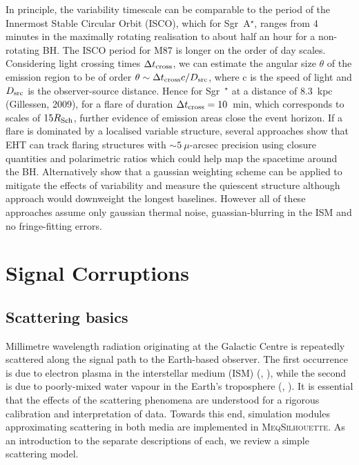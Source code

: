 In principle, the variability timescale can be comparable to the period of the Innermost Stable Circular Orbit (ISCO), which for Sgr~A$^\star$, ranges from 4 minutes in the maximally rotating realisation to about half an hour for a non-rotating BH. The ISCO period for M87 is longer on the order of day scales. Considering light crossing times $\Delta t_{\rm cross}$, we can estimate the angular size $\theta$ of the emission region to be of order $\theta \sim \Delta t_{\rm cross} c /D_{\rm src}$, where c is the speed of light and $D_{\rm src}$ is the observer-source distance. Hence for Sgr~$^\star$ at a distance of $8.3$~kpc (Gillessen, 2009), for a flare of duration $ \Delta t_{\rm cross} =10$~min, which corresponds to scales of  $15 R_{\rm Sch}$, further evidence of emission areas close the event horizon.
If a flare is dominated by a localised variable structure, several approaches \citep{Doeleman_2009, Fish_2009b, Johnson_2014} show that EHT can track flaring structures with $\sim 5\ \mu$-arcsec precision using closure quantities and polarimetric ratios which could help map the spacetime around the BH. Alternatively \citet{Lu_2016} show that a gaussian weighting scheme can be applied to mitigate the effects of variability and measure the quiescent structure although approach would downweight the longest baselines. However all of these approaches assume only gaussian thermal noise, guassian-blurring in the ISM and no fringe-fitting errors.

\section{Signal Corruptions}

\subsection{Scattering basics}

Millimetre wavelength radiation originating at the Galactic Centre is repeatedly scattered along the signal path to the Earth-based observer. The first occurrence is due to electron plasma in the interstellar medium (ISM) (\citealt{Bower_2006}, \citealt{Gwinn_2014}), while the second is due to poorly-mixed water vapour in the Earth's troposphere (\citealt*{Carilli_1999}, \citealt*{Lay_1997}). It is essential that the effects of the scattering phenomena are understood for a rigorous calibration and interpretation of data.  Towards this end, simulation modules approximating scattering in both media are implemented in \textsc{MeqSilhouette}. As an introduction to the separate descriptions of each, we review a simple scattering model.

